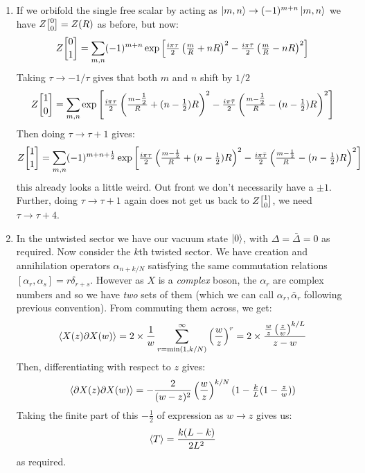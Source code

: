 \documentclass[11pt]{article}
\begin{document}
\begin{enumerate}
	\item If we orbifold the single free scalar by acting as $\ket{m, n} \to (-1)^{m+n} \ket{m, n}$ we have $Z\twist00 = Z(R)$ as before, but now:
	\[
		Z\twist01 = \sum_{m,n} (-1)^{m+n} \exp\left[\tfrac{i \pi \tau}{2} \left( \tfrac{m}{R} + n R \right)^2 - \tfrac{i \pi \bar \tau}{2} \left( \tfrac{m}{R} - n R \right)^2  \right]
	\]
	Taking $\tau \to -1/\tau$ gives that both $m$ and $n$ shift by $1/2$
	\[
		Z\twist10 = \sum_{m,n} \exp\left[\tfrac{i \pi \tau}{2} \left( \tfrac{m-\tfrac12}{R} + (n-\tfrac12) R \right)^2 - \tfrac{i \pi \bar \tau}{2} \left( \tfrac{m-\tfrac12}{R} - (n-\tfrac12) R \right)^2  \right]
	\]
	Then doing $\tau \to \tau+1$ gives:
	\[
		Z\twist11 = \sum_{m,n} (-1)^{m+n+\frac12} \exp\left[\tfrac{i \pi \tau}{2} \left( \tfrac{m-\frac12}{R} + (n-\tfrac12) R \right)^2 - \tfrac{i \pi \bar \tau}{2} \left( \tfrac{m-\frac12}{R} - (n-\tfrac12) R \right)^2 \right]
	\]
	this already looks a little weird. Out front we don't necessarily have a $\pm 1$. Further, doing $\tau \to \tau+1$ again does not get us back to $Z\twist10$, we need $\tau \to \tau+4$.
	\item In the untwisted sector we have our vacuum state $\ket0$, with $\Delta = \bar \Delta = 0$ as required. Now consider the $k$th twisted sector. We have creation and annihilation operators $\alpha_{n+k/N}$ satisfying the same commutation relations $[\alpha_r, \alpha_s] = r \delta_{r+s}$. However as $X$ is a \emph{complex} boson, the $\alpha_r$ are complex numbers and so we have \emph{two} sets of them (which we can call $\alpha_r, \bar \alpha_r$ following previous convention). From commuting them across, we get:
	\[
		\braket{X(z) \partial X(w)} = 2 \times \frac1w \sum_{r=\mathrm{min}(1,k/N)}^\infty \left( \frac{w}{z} \right)^r = 2 \times \frac{\frac{w}{z} \left(\frac{z}{w} \right)^{k/L}}{z-w}
	\]
	Then, differentiating with respect to $z$ gives:
	\[
		\braket{\partial X(z) \partial X(w)} = - \frac{2}{(w-z)^2} \left(\frac{w}{z}\right)^{k/N} (1 - \tfrac{k}{L} (1 - \tfrac{z}{w}) )
	\]
	Taking the finite part of this $-\frac12$ of expression as $w \to z$ gives us:
	\[
		\braket{T} = \frac{k (L-k)}{2 L^2}
	\]
	as required. 
	

\end{enumerate}
\end{document}
